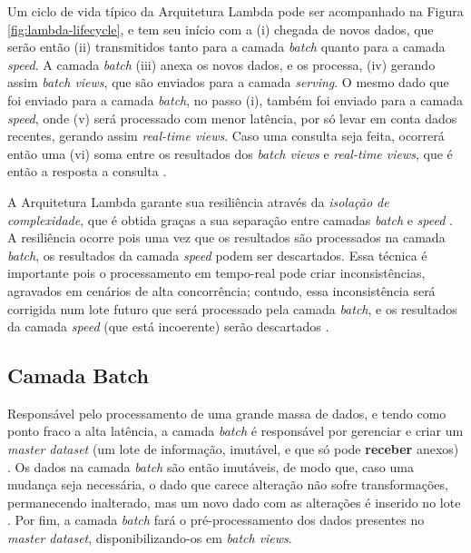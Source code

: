 Um ciclo de vida típico da Arquitetura Lambda pode ser acompanhado na Figura
\ref{fig:lambda-lifecycle}, e tem seu início com a (i) chegada
de novos dados, que serão então (ii) transmitidos tanto para a camada
\textit{batch} quanto para a camada \textit{speed}. A camada \textit{batch}
(iii) anexa os novos dados, e os processa, (iv) gerando assim
\textit{batch views}, que são enviados para a camada \textit{serving}. O mesmo
dado que foi enviado para a camada \textit{batch}, no passo (i), também foi
enviado para a camada \textit{speed}, onde (v) será processado com menor latência,
por só levar em conta dados recentes, gerando assim \textit{real-time views}. 
Caso uma consulta seja feita, ocorrerá então uma (vi) soma entre os resultados
dos \textit{batch views} e \textit{real-time views}, que é então a resposta
a consulta \cite{marz2015}.

A Arquitetura Lambda garante sua resiliência através da \textit{isolação de
complexidade}, que é obtida graças a sua separação entre camadas \textit{batch}
e \textit{speed} \cite{marz2015}. A resiliência ocorre pois uma vez que os
resultados são processados na camada \textit{batch}, os resultados da camada
\textit{speed} podem ser descartados. Essa técnica é importante pois o
processamento em tempo-real pode criar inconsistências, agravados em cenários
de alta concorrência; contudo, essa inconsistência será corrigida num lote
futuro que será processado pela camada \textit{batch}, e os resultados
da camada \textit{speed} (que está incoerente) serão descartados \cite{marz2015}.


\subsection{Camada Batch}

Responsável pelo processamento de uma grande massa de dados, e tendo como ponto
fraco a alta latência, a camada \textit{batch} é responsável por gerenciar e
criar um \textit{master dataset} (um lote de informação, imutável, e que só
pode \textbf{receber} anexos) \cite{marz2015}. Os dados na camada \textit{batch}
são então imutáveis, de modo que, caso uma mudança seja necessária, o dado que
carece alteração não sofre transformações, permanecendo inalterado, mas um novo
dado com as alterações é inserido no lote \cite{marz2015}. Por fim, a camada
\textit{batch} fará o pré-processamento dos dados presentes no
\textit{master dataset}, disponibilizando-os em \textit{batch views}.

